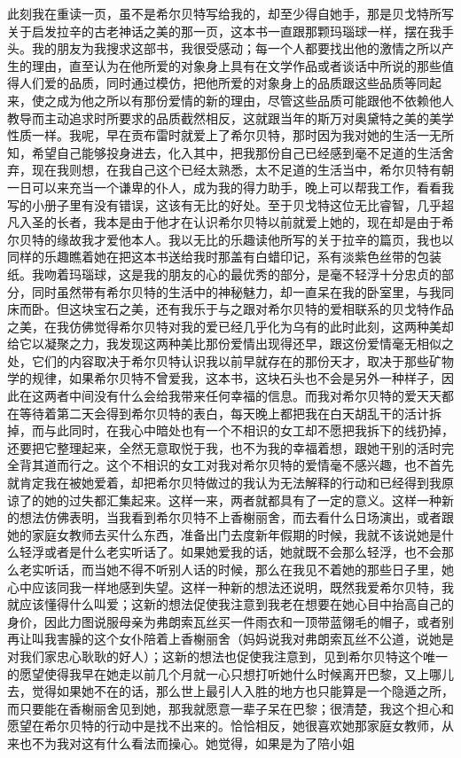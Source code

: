\par 此刻我在重读一页，虽不是希尔贝特写给我的，却至少得自她手，那是贝戈特所写关于启发拉辛的古老神话之美的那一页，这本书一直跟那颗玛瑙球一样，摆在我手头。我的朋友为我搜求这部书，我很受感动；每一个人都要找出他的激情之所以产生的理由，直至认为在他所爱的对象身上具有在文学作品或者谈话中所说的那些值得人们爱的品质，同时通过模仿，把他所爱的对象身上的品质跟这些品质等同起来，使之成为他之所以有那份爱情的新的理由，尽管这些品质可能跟他不依赖他人教导而主动追求时所要求的品质截然相反，这就跟当年的斯万对奥黛特之美的美学性质一样。我呢，早在贡布雷时就爱上了希尔贝特，那时因为我对她的生活一无所知，希望自己能够投身进去，化入其中，把我那份自己已经感到毫不足道的生活舍弃，现在我则想，在我自己这个已经太熟悉，太不足道的生活当中，希尔贝特有朝一日可以来充当一个谦卑的仆人，成为我的得力助手，晚上可以帮我工作，看看我写的小册子里有没有错误，这该有无比的好处。至于贝戈特这位无比睿智，几乎超凡入圣的长者，我本是由于他才在认识希尔贝特以前就爱上她的，现在却是由于希尔贝特的缘故我才爱他本人。我以无比的乐趣读他所写的关于拉辛的篇页，我也以同样的乐趣瞧着她在把这本书送给我时那盖有白蜡印记，系有淡紫色丝带的包装纸。我吻着玛瑙球，这是我的朋友的心的最优秀的部分，是毫不轻浮十分忠贞的部分，同时虽然带有希尔贝特的生活中的神秘魅力，却一直呆在我的卧室里，与我同床而卧。但这块宝石之美，还有我乐于与之跟对希尔贝特的爱相联系的贝戈特作品之美，在我仿佛觉得希尔贝特对我的爱已经几乎化为乌有的此时此刻，这两种美却给它以凝聚之力，我发现这两种美比那份爱情出现得还早，跟这份爱情毫无相似之处，它们的内容取决于希尔贝特认识我以前早就存在的那份天才，取决于那些矿物学的规律，如果希尔贝特不曾爱我，这本书，这块石头也不会是另外一种样子，因此在这两者中间没有什么会给我带来任何幸福的信息。而我对希尔贝特的爱天天都在等待着第二天会得到希尔贝特的表白，每天晚上都把我在白天胡乱干的活计拆掉，而与此同时，在我心中暗处也有一个不相识的女工却不愿把我拆下的线扔掉，还要把它整理起来，全然无意取悦于我，也不为我的幸福着想，跟她干别的活时完全背其道而行之。这个不相识的女工对我对希尔贝特的爱情毫不感兴趣，也不首先就肯定我在被她爱着，却把希尔贝特做过的我认为无法解释的行动和已经得到我原谅了的她的过失都汇集起来。这样一来，两者就都具有了一定的意义。这样一种新的想法仿佛表明，当我看到希尔贝特不上香榭丽舍，而去看什么日场演出，或者跟她的家庭女教师去买什么东西，准备出门去度新年假期的时候，我就不该说她是什么轻浮或者是什么老实听话了。如果她爱我的话，她就既不会那么轻浮，也不会那么老实听话，而当她不得不听别人话的时候，那么在我见不着她的那些日子里，她心中应该同我一样地感到失望。这样一种新的想法还说明，既然我爱希尔贝特，我就应该懂得什么叫爱；这新的想法促使我注意到我老在想要在她心目中抬高自己的身价，因此力图说服母亲为弗朗索瓦丝买一件雨衣和一顶带蓝翎毛的帽子，或者别再让叫我害臊的这个女仆陪着上香榭丽舍（妈妈说我对弗朗索瓦丝不公道，说她是对我们家忠心耿耿的好人）；这新的想法也促使我注意到，见到希尔贝特这个唯一的愿望使得我早在她走以前几个月就一心只想打听她什么时候离开巴黎，又上哪儿去，觉得如果她不在的话，那么世上最引人入胜的地方也只能算是一个隐遁之所，而只要能在香榭丽舍见到她，那我就愿意一辈子呆在巴黎；很清楚，我这个担心和愿望在希尔贝特的行动中是找不出来的。恰恰相反，她很喜欢她那家庭女教师，从来也不为我对这有什么看法而操心。她觉得，如果是为了陪小姐